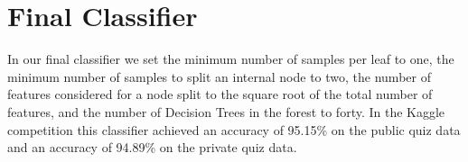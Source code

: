 \documentclass[twoside,11pt]{homework}
\begin{document}


\section*{Final Classifier}

In our final classifier we set the minimum number of samples per leaf to one, the minimum number of samples to split an internal
node to two, the number of features considered for a node split to the square root of the total number of features,
and the number of Decision Trees in the forest to forty. In the Kaggle competition this classifier achieved an accuracy of 95.15\%
on the public quiz data and an accuracy of 94.89\% on the private quiz data.
\end{document}
